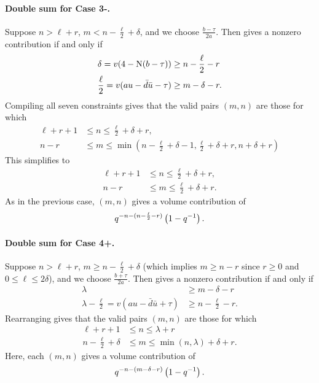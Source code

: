 \paragraph{Double sum for Case 3\ts-.}
Suppose $n > \ell + r$,
$m < n - \frac{\ell}{2} + \delta$, and we choose $\frac{b-\tau}{2a}$.
Then  gives a nonzero contribution if and only if
\begin{align*}
  \delta = v(4-\operatorname{N}(b-\tau)) &\geq n - \frac{\ell}{2} - r \\
  \frac{\ell}{2} = v(au-\bar d \bar u - \tau) & \geq m - \delta - r.
\end{align*}
Compiling all seven constraints gives that the valid pairs $(m,n)$ are those for which
\begin{align*}
  \ell + r + 1 &\leq n \leq \frac{\ell}{2}+\delta+r, \\
  n-r &\leq m \leq \min\left( n - \frac{\ell}{2}+\delta - 1,
    \frac{\ell}{2} + \delta + r, n + \delta + r \right)
\end{align*}
This simplifies to
\begin{equation}
  \begin{aligned}
    \ell+r+1 &\leq n \leq \frac{\ell}{2}+\delta+r, \\
    n-r &\leq m \leq \frac{\ell}{2} + \delta + r.
  \end{aligned}
  \label{eq:even_case3_minus}
\end{equation}
As in the previous case, $(m,n)$ gives a volume contribution of
\[ q^{-n - (n - \frac{\ell}{2} - r)} \left( 1 - q^{-1} \right). \]

\paragraph{Double sum for Case 4\ts+.}
Suppose $n > \ell + r$,
$m \ge n - \frac{\ell}{2} + \delta$
(which implies $m \ge n-r$ since $r \ge 0$ and $0 \le \ell \le 2 \delta$),
and we choose $\frac{b+\tau}{2a}$.
Then  gives a nonzero contribution if and only if
\begin{align*}
  \lambda &\geq m - \delta - r \\
  \lambda - \frac{\ell}{2} = v(au-\bar d \bar u + \tau) & \geq n - \frac{\ell}{2} - r.
\end{align*}
Rearranging gives that the valid pairs $(m,n)$ are those for which
\begin{equation}
  \begin{aligned}
    \ell + r + 1 &\leq n \leq \lambda + r \\
    n - \frac{\ell}{2} + \delta &\leq m \leq \min(n, \lambda) + \delta + r.
  \end{aligned}
  \label{eq:even_case4_plus}
\end{equation}
Here, each $(m,n)$ gives a volume contribution of
\[ q^{-n - (m - \delta - r)} \left( 1 - q^{-1} \right). \]

